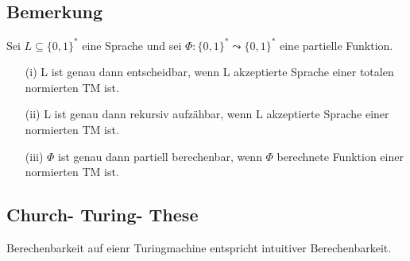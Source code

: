 \subsection{Bemerkung} Sei $L \subseteq \{0, 1\}^*$ eine Sprache und sei $\Phi : \{0, 1\}^* \leadsto \{0, 1\}^*$ eine partielle Funktion.
\begin{itemize}
  \item [(i)] L ist genau dann entscheidbar, wenn L akzeptierte Sprache einer totalen normierten TM ist. 
  \item [(ii)] L ist genau dann rekursiv aufzähbar, wenn L akzeptierte Sprache einer normierten TM ist.
  \item [(iii)] $\Phi$ ist genau dann partiell berechenbar, wenn $\Phi$ berechnete Funktion einer normierten TM ist.
\end{itemize}

\subsection{Church- Turing- These} Berechenbarkeit auf eienr Turingmachine entspricht intuitiver Berechenbarkeit.

